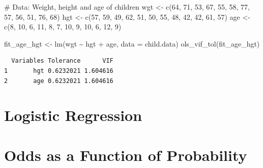 \documentclass[
  letterpaper,
]{scrbook}
\newenvironment{Shaded}{\begin{snugshade}}{\end{snugshade}}
\newcommand{\AttributeTok}[1]{\textcolor[rgb]{0.40,0.45,0.13}{#1}}
\newcommand{\CommentTok}[1]{\textcolor[rgb]{0.37,0.37,0.37}{#1}}
\newcommand{\DecValTok}[1]{\textcolor[rgb]{0.68,0.00,0.00}{#1}}
\newcommand{\FunctionTok}[1]{\textcolor[rgb]{0.28,0.35,0.67}{#1}}
\newcommand{\NormalTok}[1]{\textcolor[rgb]{0.00,0.23,0.31}{#1}}
\newcommand{\OtherTok}[1]{\textcolor[rgb]{0.00,0.23,0.31}{#1}}
\newcommand{\SpecialCharTok}[1]{\textcolor[rgb]{0.37,0.37,0.37}{#1}}
\begin{document}
\begin{Shaded}
\begin{Highlighting}[]
\CommentTok{\# Data: Weight, height and age of children}
\NormalTok{wgt }\OtherTok{\textless{}{-}} \FunctionTok{c}\NormalTok{(}\DecValTok{64}\NormalTok{, }\DecValTok{71}\NormalTok{, }\DecValTok{53}\NormalTok{, }\DecValTok{67}\NormalTok{, }\DecValTok{55}\NormalTok{, }\DecValTok{58}\NormalTok{, }\DecValTok{77}\NormalTok{, }\DecValTok{57}\NormalTok{, }\DecValTok{56}\NormalTok{, }\DecValTok{51}\NormalTok{, }\DecValTok{76}\NormalTok{, }\DecValTok{68}\NormalTok{)}
\NormalTok{hgt }\OtherTok{\textless{}{-}} \FunctionTok{c}\NormalTok{(}\DecValTok{57}\NormalTok{, }\DecValTok{59}\NormalTok{, }\DecValTok{49}\NormalTok{, }\DecValTok{62}\NormalTok{, }\DecValTok{51}\NormalTok{, }\DecValTok{50}\NormalTok{, }\DecValTok{55}\NormalTok{, }\DecValTok{48}\NormalTok{, }\DecValTok{42}\NormalTok{, }\DecValTok{42}\NormalTok{, }\DecValTok{61}\NormalTok{, }\DecValTok{57}\NormalTok{)}
\NormalTok{age }\OtherTok{\textless{}{-}} \FunctionTok{c}\NormalTok{(}\DecValTok{8}\NormalTok{, }\DecValTok{10}\NormalTok{, }\DecValTok{6}\NormalTok{, }\DecValTok{11}\NormalTok{, }\DecValTok{8}\NormalTok{, }\DecValTok{7}\NormalTok{, }\DecValTok{10}\NormalTok{, }\DecValTok{9}\NormalTok{, }\DecValTok{10}\NormalTok{, }\DecValTok{6}\NormalTok{, }\DecValTok{12}\NormalTok{, }\DecValTok{9}\NormalTok{)}

\NormalTok{fit\_age\_hgt }\OtherTok{\textless{}{-}} \FunctionTok{lm}\NormalTok{(wgt }\SpecialCharTok{\textasciitilde{}}\NormalTok{ hgt }\SpecialCharTok{+}\NormalTok{ age, }\AttributeTok{data =}\NormalTok{ child.data)}
\FunctionTok{ols\_vif\_tol}\NormalTok{(fit\_age\_hgt)}
\end{Highlighting}
\end{Shaded}

\begin{verbatim}
  Variables Tolerance      VIF
1       hgt 0.6232021 1.604616
2       age 0.6232021 1.604616
\end{verbatim}

\section{Logistic Regression}\label{logistic-regression}

\section{Odds as a Function of
Probability}\label{odds-as-a-function-of-probability}
\end{document}
